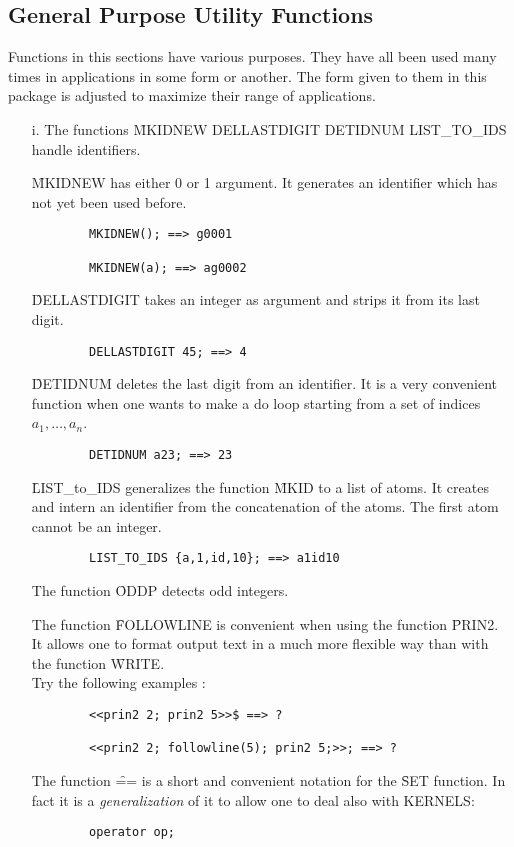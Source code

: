 \subsection{General Purpose Utility Functions}
Functions in this sections have various purposes. They have all been used
many times in applications in some form or another. The form given
to them in this package is adjusted to maximize their range of applications.
\begin{itemize}
\item[i.]
The functions \f{MKIDNEW DELLASTDIGIT DETIDNUM LIST\_TO\_IDS}
handle identifiers. 

\f{MKIDNEW} has either 0 or 1 argument. 
It generates an identifier which has not yet been used before.
\begin{verbatim}
        MKIDNEW(); ==> g0001

        MKIDNEW(a); ==> ag0002
\end{verbatim}
\f{DELLASTDIGIT} takes an integer as argument and strips it from its last
digit.
\begin{verbatim}
        DELLASTDIGIT 45; ==> 4
\end{verbatim}
\f{DETIDNUM} deletes the last digit from an
identifier. It is a very convenient function when one wants to make a do
loop starting from a set of indices $ a_1, \ldots , a_{n} $.
\begin{verbatim}
        DETIDNUM a23; ==> 23
\end{verbatim}

\f{LIST\_to\_IDS} generalizes the function \f{MKID} to a list of
atoms. It creates and intern an identifier from the concatenation of
the atoms. The first atom cannot be an integer.
\begin{verbatim}
        LIST_TO_IDS {a,1,id,10}; ==> a1id10
\end{verbatim}
The function \f{ODDP}  detects odd integers.

The function \f{FOLLOWLINE} is convenient when using the function \f{PRIN2}.
It allows one to format output text in a much more flexible way than with
the function \f{WRITE}. \\
Try the following examples :
\begin{verbatim}
        <<prin2 2; prin2 5>>$ ==> ?

        <<prin2 2; followline(5); prin2 5;>>; ==> ?
\end{verbatim}
The function \f{==} is a short and convenient notation for the \f{SET}
function. In fact it is a {\em generalization} of it to allow one to
deal also with KERNELS:
\begin{verbatim}
        operator op;


\end{verbatim}
\end{itemize}
